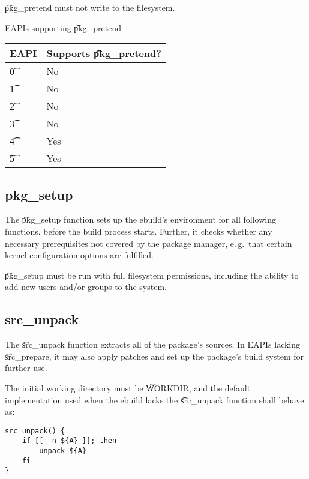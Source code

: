 \t{pkg\_pretend} must not write to the filesystem.

\begin{centertable}{EAPIs supporting \t{pkg\_pretend}} \label{tab:pkg-pretend-table}
    \begin{tabular}{ l l }
        \toprule
        \multicolumn{1}{c}{\textbf{EAPI}} &
        \multicolumn{1}{c}{\textbf{Supports \t{pkg\_pretend}?}} \\
        \midrule
    \t{0} & No \\
    \t{1} & No \\
    \t{2} & No \\
    \t{3} & No \\
    \t{4} & Yes \\
    \t{5} & Yes \\
    \bottomrule
    \end{tabular}
\end{centertable}

\subsection{pkg\_setup}
\label{sec:pkg-setup-function}
The \t{pkg\_setup} function sets up the ebuild's environment for all following functions, before
the build process starts. Further, it checks whether any necessary prerequisites not covered
by the package manager, e.\,g.\ that certain kernel configuration options are fulfilled.

\t{pkg\_setup} must be run with full filesystem permissions, including the ability to add new users
and/or groups to the system.

\subsection{src\_unpack}
\label{sec:src-unpack-function}

 The \t{src\_unpack} function extracts all of
the package's sources. In EAPIs lacking \t{src\_prepare}, it may also
apply patches and set up the package's build system for further use.

The initial working directory must be \t{WORKDIR}, and the default implementation used when
the ebuild lacks the \t{src\_unpack} function shall behave as:

\begin{verbatim}
src_unpack() {
    if [[ -n ${A} ]]; then
        unpack ${A}
    fi
}
\end{verbatim}

